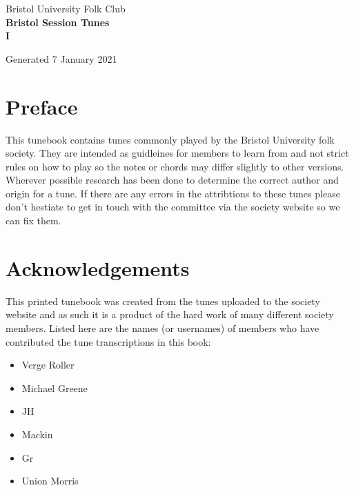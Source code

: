 \documentclass[12pt,a4paper,twoside]{article}
\makeatletter
\newcommand{\thetitle}{Bristol Session Tunes \\ \vspace{0.65cm} I}
\newcommand{\thedate}{7 January 2021}
\renewcommand\tableofcontents{%
    \begin{multicols}{2}[
      \centering
      \section*{\large\contentsname
        \@mkboth{%
           \MakeUppercase\contentsname}{\MakeUppercase\contentsname}}]
    \@starttoc{toc}%
    \end{multicols}
}
\makeatother
\begin{document}
\begin{titlepage}
   \begin{center}
       \large Bristol University Folk Club \\

       \vspace{4cm}
       \textbf{\Huge \thetitle}

       \vspace{0.5cm}
       Generated \thedate

       \vspace{1.5cm}

       \vfill

   \end{center}
\end{titlepage}

\tableofcontents

\section{Preface}

This tunebook contains tunes commonly played by the Bristol University folk society. They are intended as guidleines for members to learn from and not strict rules on how to play so the notes or chords may differ slightly to other versions.
Wherever possible research has been done to determine the correct author and origin for a tune. If there are any errors in the attribtions to these tunes please don't hestiate to get in touch with the committee via the society website so we can fix them.

\section{Acknowledgements}

This printed tunebook was created from the tunes uploaded to the society website and as such it is a product of the hard work of many different society members. Listed here are the names (or usernames) of members who have contributed the tune transcriptions in this book:

\begin{multicols}{2}
\begin{itemize}\item Verge Roller
\item Michael Greene
\item JH
\item Mackin
\item Gr
\item Union Morris
\end{itemize}

\end{multicols}
\end{document}
